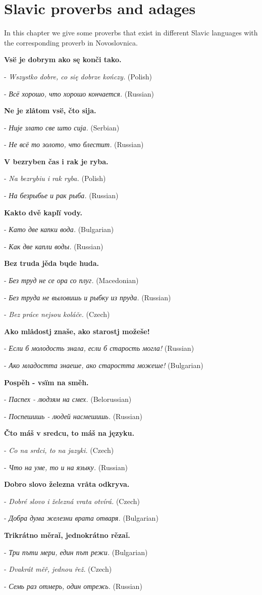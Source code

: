 \section{Slavic proverbs and adages}

In this chapter we give some proverbs that exist in different Slavic languages with the corresponding proverb in Novoslovnica.

\textbf{Vsë je dobrym ako sę konči tako.}

- \textit{Wszystko dobre, co się dobrze kończy.} (Polish)

- \textit{Всё хорошо, что хорошо кончается.} (Russian)

\textbf{Ne je zlåtom vsë, čto sija.}

- \textit{Није злато све што сија.} (Serbian)

- \textit{Не всё то золото, что блестит.} (Russian)

\textbf{V bezryben čas i rak je ryba.}

- \textit{Na bezrybiu i rak ryba.} (Polish)

- \textit{На безрыбье и рак рыба.} (Russian)

\textbf{Kakto dvě kaplï vody.}

- \textit{Като две капки вода.} (Bulgarian)

- \textit{Как две капли воды.} (Russian)

\textbf{Bez truda jěda bųde huda.}

- \textit{Без труд не се ора со плуг.} (Macedonian)

- \textit{Без труда не выловишь и рыбку из пруда.} (Russian)

- \textit{Bez práce nejsou koláče.} (Czech)

\textbf{Ako mlådostj znaše, ako starostj možeše!}

- \textit{Если б молодость знала, если б старость могла!} (Russian)

- \textit{Ако младостта знаеше, ако старостта можеше!} (Bulgarian)

\textbf{Pospěh - vsïm na směh.}

- \textit{Паспех - людзям на смех.} (Belorussian)

- \textit{Поспешишь - людей насмешишь.} (Russian)

\textbf{Čto máš v sredcu, to máš na języku.}

- \textit{Co na srdci, to na jazyki.} (Czech)

- \textit{Что на уме, то и на языку.} (Russian)

\textbf{Dobro slovo železna vråta odkryva.}

- \textit{Dobré slovo i železná vrata otvírá.} (Czech)

- \textit{Добра дума железни врата отваря.} (Bulgarian)

\textbf{Trikrátno měraǐ, jednokrátno rězaǐ.}

- \textit{Три пъти мери, един път режи.} (Bulgarian)

- \textit{Dvakrát měř, jednou řež.} (Czech)

- \textit{Семь раз отмерь, один отрежь.} (Russian)